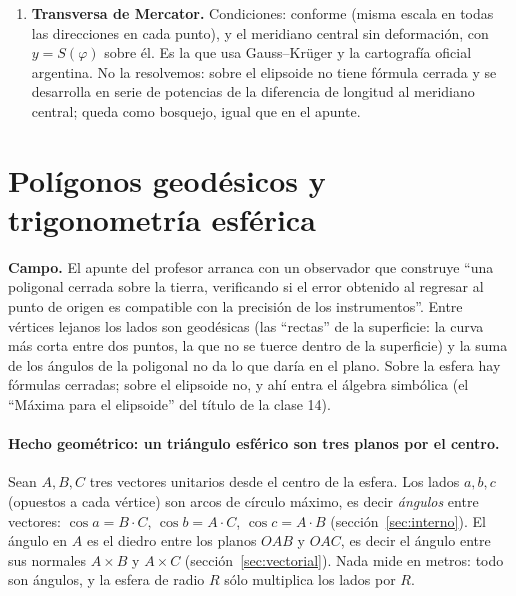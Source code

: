 \begin{enumerate}
  radio \(R_q\) con la misma área total, \(4\pi R_q^2=2\pi a^2q_A(\pi/2)\), es decir
  \(R_q=a\sqrt{q_A(\pi/2)/2}=6\,371\,007{,}181\) m (control: el área del elipsoide GRS80
  es \(510\,065\,621{,}7\) km\(^2\) por la fórmula exacta
  \(2\pi a^2+\pi\frac{b^2}e\ln\frac{1+e}{1-e}\), y \(4\pi R_q^2\) da lo mismo); y a cada
  paralelo \(\varphi\) le corresponde en la esfera la latitud \(\beta_A\) con
  \(\sin\beta_A=q_A(\varphi)/q_A(\pi/2)\) (latitud autálica): \(44{,}8717^\circ\) para
  \(45^\circ\), \(-34{,}4801^\circ\) para Buenos Aires. Lo demás (las longitudes) no cambia.
  \item \textbf{Transversa de Mercator.} Condiciones: conforme (misma escala en todas las
  direcciones en cada punto), y el meridiano central sin deformación, con \(y=S(\varphi)\)
  sobre él. Es la que usa Gauss--Krüger y la cartografía oficial argentina. No la resolvemos:
  sobre el elipsoide no tiene fórmula cerrada y se desarrolla en serie de potencias de la
  diferencia de longitud al meridiano central; queda como bosquejo, igual que en el apunte.
\end{enumerate}

\section{Polígonos geodésicos y trigonometría esférica}\label{sec:trigonometria-esferica}

{\small\vspace{1mm}\par}


\textbf{Campo.} El apunte del profesor arranca con un observador que construye ``una
poligonal cerrada sobre la tierra, verificando si el error obtenido al regresar al punto de
origen es compatible con la precisión de los instrumentos''. Entre vértices lejanos los
lados son geodésicas (las ``rectas'' de la superficie: la curva más corta entre dos puntos,
la que no se tuerce dentro de la superficie) y la suma de los ángulos de la poligonal no da
lo que daría en el plano. Sobre la esfera hay fórmulas cerradas; sobre el elipsoide no, y
ahí entra el álgebra simbólica (el ``Máxima para el elipsoide'' del título de la clase 14).

\paragraph{Hecho geométrico: un triángulo esférico son tres planos por el centro.} Sean
\(A,B,C\) tres vectores unitarios desde el centro de la esfera. Los lados \(a,b,c\)
(opuestos a cada vértice) son arcos de círculo máximo, es decir \emph{ángulos} entre
vectores: \(\cos a=B\cdot C\), \(\cos b=A\cdot C\), \(\cos c=A\cdot B\)
(sección~\ref{sec:interno}). El ángulo en \(A\) es el diedro entre los planos \(OAB\) y
\(OAC\), es decir el ángulo entre sus normales \(A\times B\) y \(A\times C\)
(sección~\ref{sec:vectorial}). Nada mide en metros: todo son ángulos, y la esfera de radio
\(R\) sólo multiplica los lados por \(R\).

